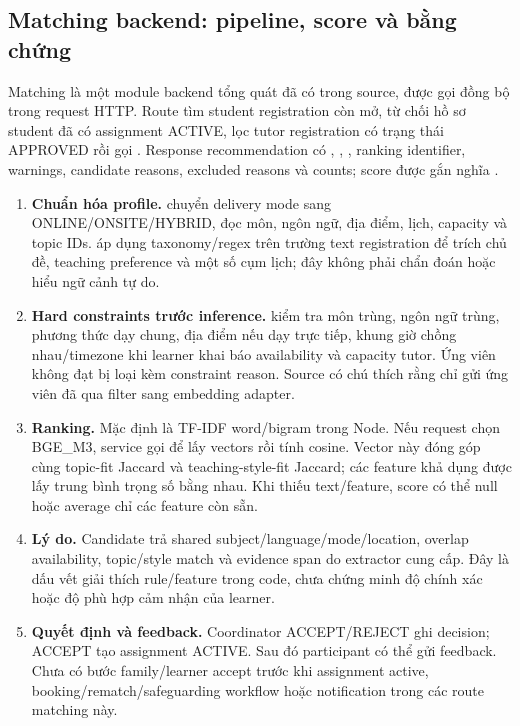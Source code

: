 \documentclass[11pt,a4paper]{article}
\begin{document}
\subsection{Matching backend: pipeline, score và bằng chứng}
Matching là một module backend tổng quát đã có trong source, được gọi đồng bộ trong request HTTP. Route tìm student registration còn mở, từ chối hồ sơ student đã có assignment ACTIVE, lọc tutor registration có trạng thái APPROVED rồi gọi . Response recommendation có , , , ranking identifier, warnings, candidate reasons, excluded reasons và counts; score được gắn nghĩa .

\begin{enumerate}
  \item \textbf{Chuẩn hóa profile.}  chuyển delivery mode sang ONLINE/ONSITE/HYBRID, đọc môn, ngôn ngữ, địa điểm, lịch, capacity và topic IDs.  áp dụng taxonomy/regex trên trường text registration để trích chủ đề, teaching preference và một số cụm lịch; đây không phải chẩn đoán hoặc hiểu ngữ cảnh tự do.
  \item \textbf{Hard constraints trước inference.}  kiểm tra môn trùng, ngôn ngữ trùng, phương thức dạy chung, địa điểm nếu dạy trực tiếp, khung giờ chồng nhau/timezone khi learner khai báo availability và capacity tutor. Ứng viên không đạt bị loại kèm constraint reason. Source có chú thích rằng chỉ gửi ứng viên đã qua filter sang embedding adapter.
  \item \textbf{Ranking.} Mặc định là TF-IDF word/bigram trong Node. Nếu request chọn BGE\_M3, service gọi  để lấy vectors rồi tính cosine. Vector này đóng góp cùng topic-fit Jaccard và teaching-style-fit Jaccard; các feature khả dụng được lấy trung bình trọng số bằng nhau. Khi thiếu text/feature, score có thể null hoặc average chỉ các feature còn sẵn.
  \item \textbf{Lý do.} Candidate trả shared subject/language/mode/location, overlap availability, topic/style match và evidence span do extractor cung cấp. Đây là dấu vết giải thích rule/feature trong code, chưa chứng minh độ chính xác hoặc độ phù hợp cảm nhận của learner.
  \item \textbf{Quyết định và feedback.} Coordinator ACCEPT/REJECT ghi decision; ACCEPT tạo assignment ACTIVE. Sau đó participant có thể gửi feedback. Chưa có bước family/learner accept trước khi assignment active, booking/rematch/safeguarding workflow hoặc notification trong các route matching này.
\end{enumerate}
\end{document}
